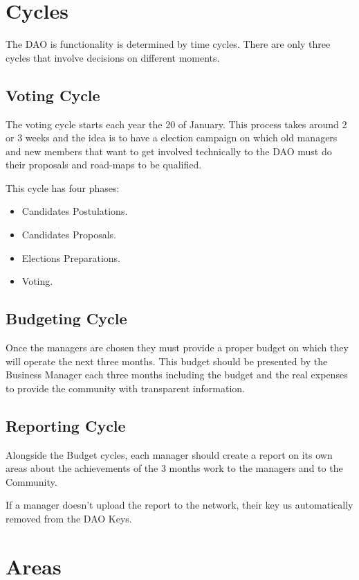\documentclass{article}
\begin{document}
\section{Cycles}

The DAO is functionality is determined by time cycles. There are only three cycles that involve decisions on different moments.

\subsection{Voting Cycle}

The voting cycle starts each year the 20 of January. This process takes around 2 or 3 weeks and the idea is to have a election campaign on which old managers and new members that want to get involved technically to the DAO must do their proposals and road-maps to be qualified.

This cycle has four phases:

\begin{itemize}
  \item Candidates Postulations.
  \item Candidates Proposals.
  \item Elections Preparations.
  \item Voting.
\end{itemize}

\subsection{Budgeting Cycle}

Once the managers are chosen they must provide a proper budget on which they will operate the next three months. This budget should be presented by the Business Manager each three months including the budget and the real expenses to provide the community with transparent information.

\subsection{Reporting Cycle}

Alongside the Budget cycles, each manager should create a report on its own areas about the achievements of the 3 months work to the managers and to the Community.

If a manager doesn't upload the report to the network, their key us automatically removed from the DAO Keys.

\section{Areas}
\end{document}
